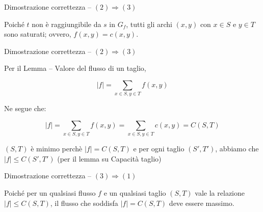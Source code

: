 \begin{frame}{Dimostrazione correttezza -- $(2) \Rightarrow (3)$}

\vspace{-9pt}

\begin{center}
\end{center}

\small
\BI
\item Poiché $t$ non è raggiungibile da $s$ in $G_f$, tutti gli
archi $(x,y)$ con $x \in S$ e $y \in T$ sono saturati;  ovvero, $f(x,y) = c(x,y)$. 
\EI

\end{frame}

\begin{frame}{Dimostrazione correttezza -- $(2) \Rightarrow (3)$}

\vspace{-9pt}

\BIL
\item Per il Lemma -- Valore del flusso di un taglio,

\[ 
  |f| = \sum_{x \in S, y \in T} f(x,y)
\]
\item Ne segue che:

\[ 
  |f| = \sum_{x \in S, y \in T} f(x,y) = \sum_{x \in S, y \in T} c(x,y) = C(S,T)
\]

\item $(S,T)$ è minimo perchè $|f|=C(S,T)$ e per ogni taglio $(S', T')$, abbiamo che $|f| \leq C(S', T')$ (per il lemma su Capacità taglio)

\EIL

\end{frame}

\begin{frame}{Dimostrazione correttezza -- $(3) \Rightarrow (1)$}

\vspace{-9pt}

\bigskip
Poiché per un qualsiasi flusso $f$ e un qualsiasi taglio $(S,T)$ vale la relazione $|f| \leq C(S,T)$, 
il flusso che soddisfa $|f| = C(S,T)$ deve essere massimo.

\end{frame}


